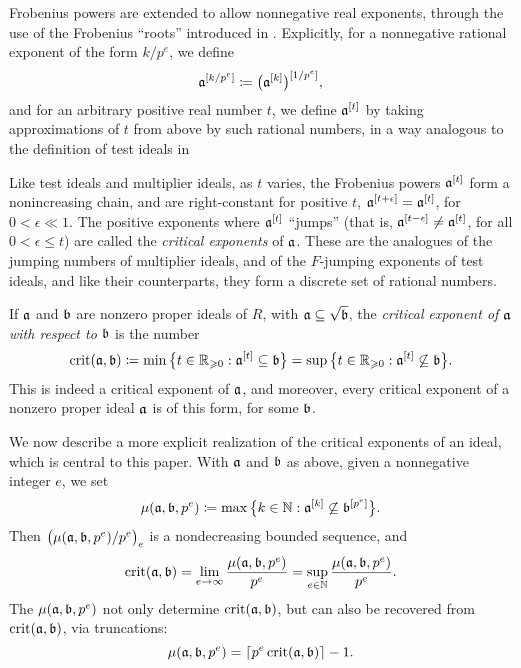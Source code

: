 \documentclass[11pt]{amsart}
\begin{document}
Frobenius powers are extended to allow nonnegative real exponents, through the use of the Frobenius ``roots'' introduced in \cite{blickle+mustata+smith.discr_rat_FPTs}.
Explicitly, for a nonnegative rational exponent of the form $k/p^e$, we define
\[\mathfrak{a}^{[k/p^e]} \coloneqq \big(\mathfrak{a}^{[k]}\big)^{[1/p^e]},\]
and for an arbitrary positive real number $t$, we define $\mathfrak{a}^{[t]}$ by taking approximations of $t$ from above by such rational numbers, in a way analogous to the definition of test ideals in \loccit
{}

Like test ideals and multiplier ideals, as $t$ varies, the Frobenius powers $\mathfrak{a}^{[t]}$ form a nonincreasing chain, and are right-constant for positive $t$, \ie $\mathfrak{a}^{[t+\epsilon]} = \mathfrak{a}^{[t]}$, for $0<\epsilon \ll 1$.
The positive exponents where $\mathfrak{a}^{[t]}$ ``jumps'' (that is, $\mathfrak{a}^{[t-\epsilon]}\ne \mathfrak{a}^{[t]}$, for all $0<\epsilon \le t$) are called the \emph{critical exponents} of $\mathfrak{a}$.
These are the analogues of the jumping numbers of multiplier ideals, and of the $F$-jumping exponents of test ideals, and like their counterparts, they form a discrete set of rational numbers.

If $\mathfrak{a}$ and $\mathfrak{b}$ are nonzero proper ideals of $R$, with $\mathfrak{a} \subseteq \sqrt{\mathfrak{b}}$, the \emph{critical exponent of $\mathfrak{a}$ with respect to $\mathfrak{b}$} is the number
\begin{equation}\label{eq: defn of crit(a,b)}
   \operatorname{crit}(\mathfrak{a},\mathfrak{b}) \coloneqq \min\big\{t\in \mathbb{R}_{\geqslant 0}: \mathfrak{a}^{[t]} \subseteq \mathfrak{b}\big\}
      = \sup\big\{t\in \mathbb{R}_{\geqslant 0}: \mathfrak{a}^{[t]} \not\subseteq \mathfrak{b}\big\}.
\end{equation}
This is indeed a critical exponent of $\mathfrak{a}$, and moreover, every critical exponent of a nonzero proper ideal $\mathfrak{a}$ is of this form, for some $\mathfrak{b}$.

We now describe a more explicit realization of the critical exponents of an ideal, which is central to this paper.
With $\mathfrak{a}$ and $\mathfrak{b}$ as above, given a nonnegative integer $e$, we set
\[\mu(\mathfrak{a},\mathfrak{b},p^e) \coloneqq \max\big\{k\in \mathbb{N} : \mathfrak{a}^{[k]} \not\subseteq \mathfrak{b}^{[p^e]}\big\}.\]
Then $\big(\mu(\mathfrak{a},\mathfrak{b},p^e)/p^e\big)_e$ is a nondecreasing bounded sequence, and 
\begin{equation}\label{eq: crit as a limit of mus}
   \operatorname{crit}(\mathfrak{a},\mathfrak{b}) = \lim_{e\to \infty} \frac{\mu(\mathfrak{a},\mathfrak{b},p^e)}{p^e} = \sup_{e\in \mathbb{N}} \frac{\mu(\mathfrak{a},\mathfrak{b},p^e)}{p^e}.
\end{equation}
The $\mu(\mathfrak{a},\mathfrak{b},p^e)$ not only determine $\operatorname{crit}(\mathfrak{a},\mathfrak{b})$, but can also be recovered from $\operatorname{crit}(\mathfrak{a},\mathfrak{b})$, via truncations:
\begin{equation}\label{eq: recovering mus from crit}
   \mu(\mathfrak{a},\mathfrak{b},p^e) = \left\lceil p^e\operatorname{crit}(\mathfrak{a},\mathfrak{b}) \right\rceil - 1.
\end{equation}
\end{document}
